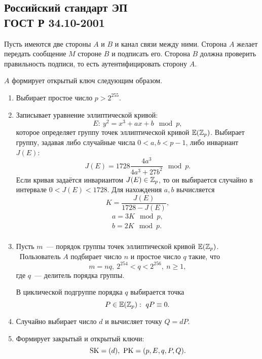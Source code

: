 \subsection[Российский стандарт ЭП ГОСТ Р 34.10-2001]{Российский стандарт ЭП \protect\\ ГОСТ Р 34.10-2001}

Пусть имеются две стороны $A$ и $B$ и канал связи между ними. Сторона $A$ желает передать сообщение $M$ стороне $B$ и подписать его. Сторона $B$ должна проверить правильность подписи, то есть аутентифицировать сторону $A$.

$A$ формирует открытый ключ следующим образом.

\begin{enumerate}
    \item Выбирает простое число $p > 2^{255}$.
    \item Записывает уравнение эллиптической кривой:
        \[ E: ~ y^2 = x^3 + a x + b \mod p, \]
        которое определяет группу точек эллиптической кривой $\mathbb{E}(\mathbb{Z}_p)$.
        Выбирает группу, задавая либо случайные числа $0 < a, b < p-1$, либо инвариант $J(E)$:
        \[ J(E) = 1728 \frac{4 a^3}{4 a^3 + 27 b^2} \mod p. \]
        Если кривая задаётся инвариантом $J(E) \in \mathbb{Z}_p$, то он выбирается случайно в интервале $0 < J(E) < 1728$. Для нахождения $a,b$ вычисляется
        \[ K = \frac{J(E)}{1728 - J(E)}, \]
        \[ \begin{array}{l}
            a = 3 K \mod p, \\
            b = 2 K \mod p. \\
        \end{array} \]
    \item Пусть $m$~--- порядок группы точек эллиптической кривой $\mathbb{E}(\mathbb{Z}_p)$. ~Пользователь $A$ подбирает число $n$ и простое число $q$ такие, что
        \[ m = n q, ~ 2^{254} < q < 2^{256}, ~ n \geq 1, \]
        где $q$~--- делитель порядка группы.

        В циклической подгруппе порядка $q$ выбирается точка
        \[ P \in \mathbb{E}(\mathbb{Z}_p): ~ q P \equiv 0. \]
    \item Случайно выбирает число $d$ и вычисляет точку $Q = d P$.
    \item Формирует закрытый и открытый ключи:
        \[ \textrm{SK} = (d), ~ \textrm{PK} = (p, E, q, P, Q). \]
\end{enumerate}

